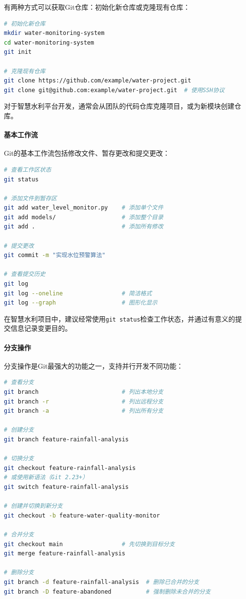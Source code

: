 有两种方式可以获取Git仓库：初始化新仓库或克隆现有仓库：

\begin{lstlisting}[language=bash]
# 初始化新仓库
mkdir water-monitoring-system
cd water-monitoring-system
git init

# 克隆现有仓库
git clone https://github.com/example/water-project.git
git clone git@github.com:example/water-project.git  # 使用SSH协议
\end{lstlisting}

对于智慧水利平台开发，通常会从团队的代码仓库克隆项目，或为新模块创建仓库。

\paragraph{基本工作流}\label{ux57faux672cux5de5ux4f5cux6d41}

Git的基本工作流包括修改文件、暂存更改和提交更改：

\begin{lstlisting}[language=bash]
# 查看工作区状态
git status

# 添加文件到暂存区
git add water_level_monitor.py    # 添加单个文件
git add models/                   # 添加整个目录
git add .                         # 添加所有修改

# 提交更改
git commit -m "实现水位预警算法"

# 查看提交历史
git log
git log --oneline                 # 简洁格式
git log --graph                   # 图形化显示
\end{lstlisting}

在智慧水利项目中，建议经常使用\passthrough{\lstinline!git status!}检查工作状态，并通过有意义的提交信息记录变更目的。

\paragraph{分支操作}\label{ux5206ux652fux64cdux4f5c}

分支操作是Git最强大的功能之一，支持并行开发不同功能：

\begin{lstlisting}[language=bash]
# 查看分支
git branch                        # 列出本地分支
git branch -r                     # 列出远程分支
git branch -a                     # 列出所有分支

# 创建分支
git branch feature-rainfall-analysis

# 切换分支
git checkout feature-rainfall-analysis
# 或使用新语法（Git 2.23+）
git switch feature-rainfall-analysis

# 创建并切换到新分支
git checkout -b feature-water-quality-monitor

# 合并分支
git checkout main                 # 先切换到目标分支
git merge feature-rainfall-analysis

# 删除分支
git branch -d feature-rainfall-analysis  # 删除已合并的分支
git branch -D feature-abandoned          # 强制删除未合并的分支
\end{lstlisting}

